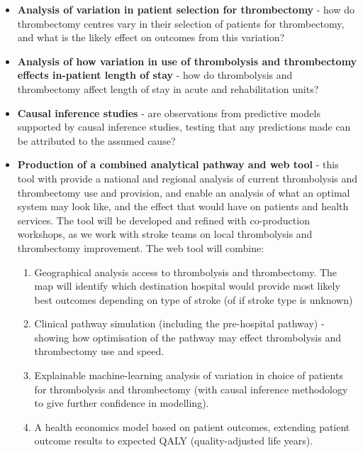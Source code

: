 \begin{itemize}
    \item \textbf{Analysis of variation in patient selection for thrombectomy} - how do thrombectomy centres vary in their selection of patients for thrombectomy, and what is the likely effect on outcomes from this variation?

    \item \textbf{Analysis of how variation in use of thrombolysis and thrombectomy effects in-patient length of stay} - how do thrombolysis and thrombectomy affect length of stay in acute and rehabilitation units?

    \item \textbf{Causal inference studies} - are observations from predictive models supported by causal inference studies, testing that any predictions made can be attributed to the assumed cause?

    \item \textbf{Production of a combined analytical pathway and web tool} - this tool with provide a national and regional analysis of current thrombolysis and thrombectomy use and provision, and enable an analysis of what an optimal system may look like, and the effect that would have on patients and health services. The tool will be developed and refined with co-production workshops, as we work with stroke teams on local thrombolysis and thrombectomy improvement. The web tool will combine:
    
    \begin{enumerate}
        \item Geographical analysis access to thrombolysis and thrombectomy. The map will identify which destination hospital would provide most likely best outcomes depending on type of stroke (of if stroke type is unknown)

        \item Clinical pathway simulation (including the pre-hospital pathway) - showing how optimisation of the pathway may effect thrombolysis and thrombectomy use and speed.

        \item Explainable machine-learning analysis of variation in choice of patients for thrombolysis and thrombectomy (with causal inference methodology to give further confidence in modelling).

        \item A health economics model based on patient outcomes, extending patient outcome results to expected QALY (quality-adjusted life years).
    \end{enumerate} 
    
\end{itemize}
